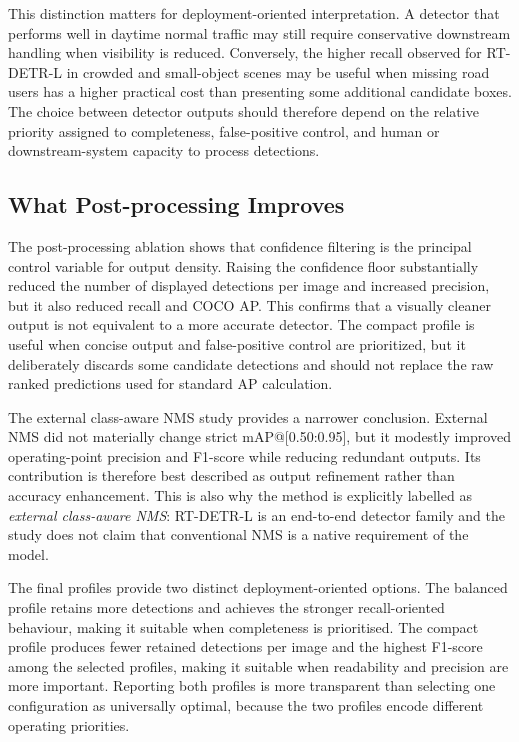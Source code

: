 \documentclass[runningheads]{llncs}
\begin{document}
This distinction matters for deployment-oriented interpretation. A detector that performs well in daytime normal traffic may still require conservative downstream handling when visibility is reduced. Conversely, the higher recall observed for RT-DETR-L in crowded and small-object scenes may be useful when missing road users has a higher practical cost than presenting some additional candidate boxes. The choice between detector outputs should therefore depend on the relative priority assigned to completeness, false-positive control, and human or downstream-system capacity to process detections.

\subsection{What Post-processing Improves}

The post-processing ablation shows that confidence filtering is the principal control variable for output density. Raising the confidence floor substantially reduced the number of displayed detections per image and increased precision, but it also reduced recall and COCO AP. This confirms that a visually cleaner output is not equivalent to a more accurate detector. The compact profile is useful when concise output and false-positive control are prioritized, but it deliberately discards some candidate detections and should not replace the raw ranked predictions used for standard AP calculation.

The external class-aware NMS study provides a narrower conclusion. External NMS did not materially change strict mAP@[0.50:0.95], but it modestly improved operating-point precision and F1-score while reducing redundant outputs. Its contribution is therefore best described as output refinement rather than accuracy enhancement. This is also why the method is explicitly labelled as \emph{external class-aware NMS}: RT-DETR-L is an end-to-end detector family and the study does not claim that conventional NMS is a native requirement of the model.

The final profiles provide two distinct deployment-oriented options. The balanced profile retains more detections and achieves the stronger recall-oriented behaviour, making it suitable when completeness is prioritised. The compact profile produces fewer retained detections per image and the highest F1-score among the selected profiles, making it suitable when readability and precision are more important. Reporting both profiles is more transparent than selecting one configuration as universally optimal, because the two profiles encode different operating priorities.
\end{document}
